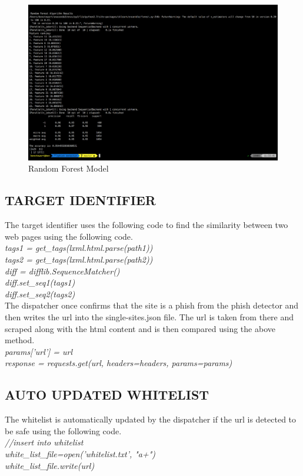 \begin{figure}[!htp]
\centering
\includegraphics[scale=0.2]{Figures/image7.png}
\caption{Random Forest Model}
\label{fig:randomforest}
\end{figure}

\subsection{TARGET IDENTIFIER}
The target identifier uses the following code to find the similarity between two web pages using the following code.\\
\null\quad\textit{tags1 = get\_tags(lxml.html.parse(path1))}\\
\null\quad\textit{tags2 = get\_tags(lxml.html.parse(path2))}\\
\null\quad\textit{diff = difflib.SequenceMatcher()}\\
\null\quad\textit{diff.set\_seq1(tags1)}\\
\null\quad\textit{ diff.set\_seq2(tags2)}\\

The dispatcher once confirms that the site is a phish from the phish detector and then writes the url into the single-sites.json file. The url is taken from there and scraped along with the html content and is then compared using the above method.\\
\null\quad\textit{params['url'] = url}\\
\null\quad\textit{response = requests.get(url, headers=headers, params=params)}\\

\subsection{AUTO UPDATED WHITELIST}
The whitelist is automatically updated by the dispatcher if the url is detected to be safe using the following code.\\
\null\quad\textit{//insert into whitelist}\\
\null\quad\textit{white\_list\_file=open('whitelist.txt', "a+")}\\
\null\quad\textit{white\_list\_file.write(url)}\\

